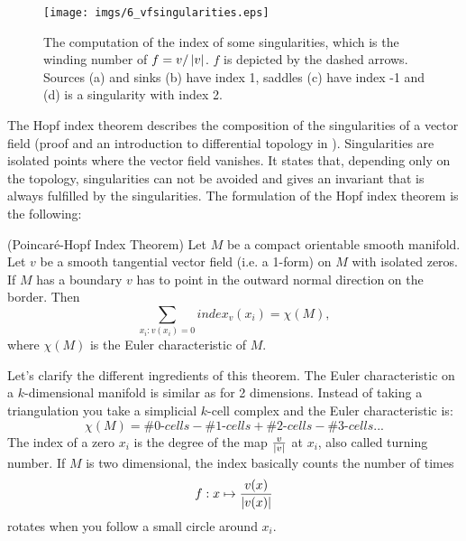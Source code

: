 

\begin{figure}%
\begin{center}
\texttt{[image: imgs/6\_vfsingularities.eps]}%
\end{center}
\caption{The computation of the index of some singularities, which is the winding number of $f = v / \left| v \right|$. $f$ is depicted by the dashed arrows. Sources (a) and sinks (b) have index 1, saddles (c) have index -1 and (d) is a singularity with index 2. }%
\label{fig:vfsingularities}%
\end{figure}

The Hopf index theorem describes the composition of the singularities of a vector field (proof and an introduction to differential topology in \cite{guillemin1974differential}). Singularities are isolated points where the vector field vanishes. It states that, depending only on the topology, singularities can not be avoided and gives an invariant that is always fulfilled by the singularities. 
The formulation of the Hopf index theorem is the following:
\begin{thm}(Poincar\'e-Hopf Index Theorem) Let $M$ be a compact orientable smooth manifold. Let $v$ be a smooth tangential vector field (i.e. a 1-form) on $M$ with isolated zeros. If $M$ has a boundary $v$ has to point in the outward normal direction on the border. Then
\[\sum_{x_i: v(x_i) = 0} index_v(x_i) = \chi(M),\]
where $\chi(M)$ is the Euler characteristic of $M$.
\end{thm}
Let's clarify the different ingredients of this theorem. The Euler characteristic on a $k$-dimensional manifold is similar as for 2 dimensions. Instead of taking a triangulation you take a simplicial $k$-cell complex and the Euler characteristic is:
\[\chi(M) = \# \textit{0-cells} - \# \textit{1-cells} + \# \textit{2-cells} - \# \textit{3-cells} ...\]
The index of a zero $x_i$ is the degree of the map $\frac{v}{\left| v \right|}$ at $x_i$, also called turning number. If $M$ is two dimensional, the index basically counts the number of times 
\[f: x \mapsto \frac{v(x)}{\left| v(x) \right|}\] 
rotates when you follow a small circle around $x_i$.
